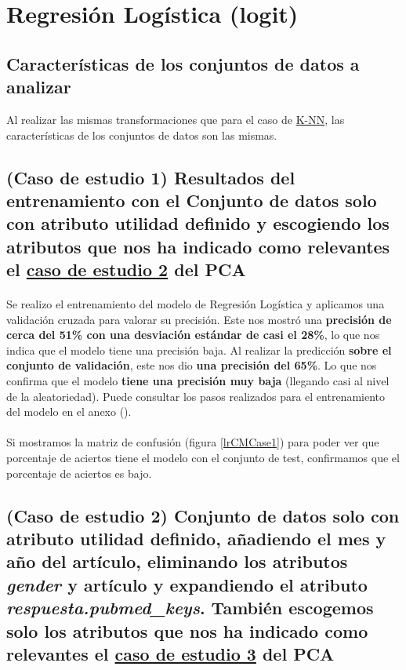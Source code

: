 \section{Regresión Logística (logit)}
\label{resultados:lr}

\subsection{Características de los conjuntos de datos a analizar}
\label{resultados:lr_caracteristicas}
Al realizar las mismas transformaciones que para el caso de \hyperref[resultados:knn_caracteristicas]{K-NN}, las características de los conjuntos de datos son las mismas.

\subsection{(Caso de estudio 1) Resultados del entrenamiento con el Conjunto de datos solo con atributo utilidad definido y escogiendo los atributos que nos ha indicado como relevantes el \hyperref[result:pca_case2]{caso de estudio 2} del PCA}

\paragraph{}
Se realizo el entrenamiento del modelo de Regresión Logística\cite{ref:lr_def} y aplicamos una validación cruzada\cite{ref:lr_cross_validation} para valorar su precisión. Este nos mostró una \textbf{precisión de cerca del 51\% con una desviación estándar de casi el 28\%}, lo que nos indica que el modelo tiene una precisión baja. Al realizar la predicción \textbf{sobre el conjunto de validación}, este nos dio \textbf{una precisión del 65\%}. Lo que nos confirma que el modelo \textbf{tiene una precisión muy baja} (llegando casi al nivel de la aleatoriedad). Puede consultar los pasos realizados para el entrenamiento del modelo en el anexo ().

\paragraph{}
Si mostramos la matriz de confusión\cite{ref:confusion_matrix} (figura \ref{lrCMCase1}) para poder ver que porcentaje de aciertos tiene el modelo con el conjunto de test, confirmamos que el porcentaje de aciertos es bajo.

\subsection{(Caso de estudio 2) Conjunto de datos solo con atributo utilidad definido, añadiendo el mes y año del artículo, eliminando los atributos \textit{gender} y artículo y expandiendo el atributo \textit{respuesta.pubmed\_keys}. También escogemos solo los atributos que nos ha indicado como relevantes el \hyperref[result:pca_case3]{caso de estudio 3} del PCA}

